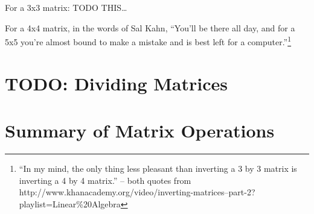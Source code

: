 For a 3x3 matrix:
%
TODO THIS\ldots

For a 4x4 matrix, in the words of Sal Kahn, ``You'll be there all day, and for a
5x5 you're almost bound to make a mistake and is best left for a
computer.''\footnote{``In my mind, the only thing less pleasant than inverting
a 3 by 3 matrix is inverting a 4 by 4 matrix.'' -- both quotes from
http://www.khanacademy.org/video/inverting-matrices--part-2?playlist=Linear\%20Algebra}

\section{TODO: Dividing Matrices}
\label{sec:DividingMatrices}

\section{Summary of Matrix Operations}
\label{sec:SummaryOfMatrixOperations}
